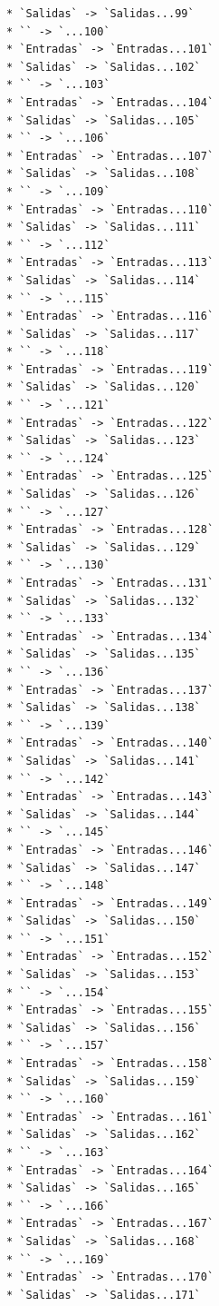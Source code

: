 \documentclass[
  letterpaper,
  DIV=11,
  numbers=noendperiod]{scrartcl}
\begin{document}
\begin{verbatim}
* `Salidas` -> `Salidas...99`
* `` -> `...100`
* `Entradas` -> `Entradas...101`
* `Salidas` -> `Salidas...102`
* `` -> `...103`
* `Entradas` -> `Entradas...104`
* `Salidas` -> `Salidas...105`
* `` -> `...106`
* `Entradas` -> `Entradas...107`
* `Salidas` -> `Salidas...108`
* `` -> `...109`
* `Entradas` -> `Entradas...110`
* `Salidas` -> `Salidas...111`
* `` -> `...112`
* `Entradas` -> `Entradas...113`
* `Salidas` -> `Salidas...114`
* `` -> `...115`
* `Entradas` -> `Entradas...116`
* `Salidas` -> `Salidas...117`
* `` -> `...118`
* `Entradas` -> `Entradas...119`
* `Salidas` -> `Salidas...120`
* `` -> `...121`
* `Entradas` -> `Entradas...122`
* `Salidas` -> `Salidas...123`
* `` -> `...124`
* `Entradas` -> `Entradas...125`
* `Salidas` -> `Salidas...126`
* `` -> `...127`
* `Entradas` -> `Entradas...128`
* `Salidas` -> `Salidas...129`
* `` -> `...130`
* `Entradas` -> `Entradas...131`
* `Salidas` -> `Salidas...132`
* `` -> `...133`
* `Entradas` -> `Entradas...134`
* `Salidas` -> `Salidas...135`
* `` -> `...136`
* `Entradas` -> `Entradas...137`
* `Salidas` -> `Salidas...138`
* `` -> `...139`
* `Entradas` -> `Entradas...140`
* `Salidas` -> `Salidas...141`
* `` -> `...142`
* `Entradas` -> `Entradas...143`
* `Salidas` -> `Salidas...144`
* `` -> `...145`
* `Entradas` -> `Entradas...146`
* `Salidas` -> `Salidas...147`
* `` -> `...148`
* `Entradas` -> `Entradas...149`
* `Salidas` -> `Salidas...150`
* `` -> `...151`
* `Entradas` -> `Entradas...152`
* `Salidas` -> `Salidas...153`
* `` -> `...154`
* `Entradas` -> `Entradas...155`
* `Salidas` -> `Salidas...156`
* `` -> `...157`
* `Entradas` -> `Entradas...158`
* `Salidas` -> `Salidas...159`
* `` -> `...160`
* `Entradas` -> `Entradas...161`
* `Salidas` -> `Salidas...162`
* `` -> `...163`
* `Entradas` -> `Entradas...164`
* `Salidas` -> `Salidas...165`
* `` -> `...166`
* `Entradas` -> `Entradas...167`
* `Salidas` -> `Salidas...168`
* `` -> `...169`
* `Entradas` -> `Entradas...170`
* `Salidas` -> `Salidas...171`
\end{verbatim}
\end{document}
